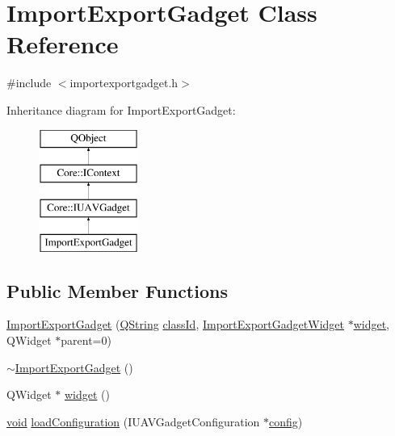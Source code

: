 \hypertarget{class_import_export_gadget}{\section{Import\-Export\-Gadget Class Reference}
\label{class_import_export_gadget}
}


{\ttfamily \#include $<$importexportgadget.\-h$>$}

Inheritance diagram for Import\-Export\-Gadget\-:\begin{figure}[H]
\begin{center}
\leavevmode
\includegraphics[height=4.000000cm]{class_import_export_gadget}
\end{center}
\end{figure}
\subsection*{Public Member Functions}
\begin{DoxyCompactItemize}
\item 
\hyperlink{group__importexportplugin_ga449e9c18b4cda73ccd909194aa3485e5}{Import\-Export\-Gadget} (\hyperlink{group___u_a_v_objects_plugin_gab9d252f49c333c94a72f97ce3105a32d}{Q\-String} \hyperlink{group___core_plugin_ga3878fde66a57220608960bcc3fbeef2c}{class\-Id}, \hyperlink{class_import_export_gadget_widget}{Import\-Export\-Gadget\-Widget} $\ast$\hyperlink{class_import_export_gadget_a048a83f292ca28210ab659bed378f33b}{widget}, Q\-Widget $\ast$parent=0)
\item 
\hyperlink{group__importexportplugin_ga43425e89a61490abd203a67eb51a61e0}{$\sim$\-Import\-Export\-Gadget} ()
\item 
Q\-Widget $\ast$ \hyperlink{class_import_export_gadget_a048a83f292ca28210ab659bed378f33b}{widget} ()
\item 
\hyperlink{group___u_a_v_objects_plugin_ga444cf2ff3f0ecbe028adce838d373f5c}{void} \hyperlink{group__importexportplugin_gaffb56b3fb88f123af21ac597a514345a}{load\-Configuration} (I\-U\-A\-V\-Gadget\-Configuration $\ast$\hyperlink{deflate_8c_a4473b5227787415097004fd39f55185e}{config})
\end{DoxyCompactItemize}
